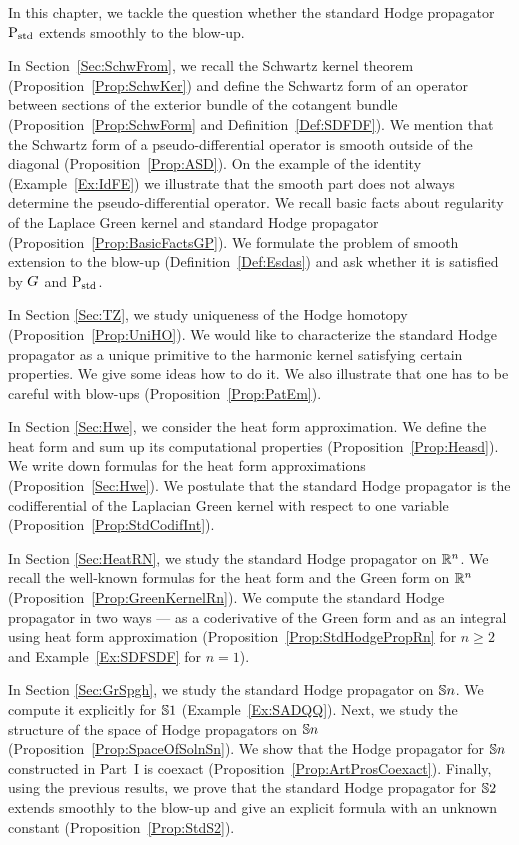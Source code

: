 \documentclass[\MainFolder/Text.tex]{subfiles}
\begin{document}
In this chapter, we tackle the question whether the standard Hodge propagator $\mathrm{P}_{\mathrm{std}}$ extends smoothly to the blow-up.

In Section~\ref{Sec:SchwFrom}, we recall the Schwartz kernel theorem (Proposition~\ref{Prop:SchwKer}) and define the Schwartz form of an operator between sections of the exterior bundle of the cotangent bundle (Proposition~\ref{Prop:SchwForm} and Definition~\ref{Def:SDFDF}). We mention that the Schwartz form of a pseudo-differential operator is smooth outside of the diagonal (Proposition~\ref{Prop:ASD}). On the example of the identity (Example~\ref{Ex:IdFE}) we illustrate that the smooth part does not always determine the pseudo-differential operator. We recall basic facts about regularity of the Laplace Green kernel and standard Hodge propagator (Proposition~\ref{Prop:BasicFactsGP}). We formulate the problem of smooth extension to the blow-up (Definition~\ref{Def:Esdas}) and ask whether it is satisfied by $G$ and $\mathrm{P}_{\mathrm{std}}$.

In Section \ref{Sec:TZ}, we study uniqueness of the Hodge homotopy (Proposition~\ref{Prop:UniHO}). We would like to characterize the standard Hodge propagator as a unique primitive to the harmonic kernel satisfying certain properties. We give some ideas how to do it. We also illustrate that one has to be careful with blow-ups (Proposition~\ref{Prop:PatEm}).

In Section \ref{Sec:Hwe}, we consider the heat form approximation. We define the heat form and sum up its computational properties (Proposition~\ref{Prop:Heasd}). We write down formulas for the heat form approximations (Proposition~\ref{Sec:Hwe}). We postulate that the standard Hodge propagator is the codifferential of the Laplacian Green kernel with respect to one variable (Proposition~\ref{Prop:StdCodifInt}).

In Section \ref{Sec:HeatRN}, we study the standard Hodge propagator on $\mathbb{R}^n$. We recall the well-known formulas for the heat form and the Green form on $\mathbb{R}^n$ (Proposition~\ref{Prop:GreenKernelRn}). We compute the standard Hodge propagator in two ways --- as a coderivative of the Green form and as an integral using heat form approximation (Proposition~\ref{Prop:StdHodgePropRn} for $n\ge 2$ and Example~\ref{Ex:SDFSDF} for $n=1$).

In Section \ref{Sec:GrSpgh}, we study the standard Hodge propagator on $\mathbb{S}{n}$. We compute it explicitly for $\mathbb{S}{1}$ (Example~\ref{Ex:SADQQ}). Next, we study the structure of the space of Hodge propagators on $\mathbb{S}{n}$ (Proposition~\ref{Prop:SpaceOfSolnSn}). We show that the Hodge propagator for $\mathbb{S}{n}$ constructed in Part~I is coexact (Proposition~\ref{Prop:ArtProsCoexact}). Finally, using the previous results, we prove that the standard Hodge propagator for $\mathbb{S}{2}$ extends smoothly to the blow-up and give an explicit formula with an unknown constant (Proposition~\ref{Prop:StdS2}).
\end{document}
